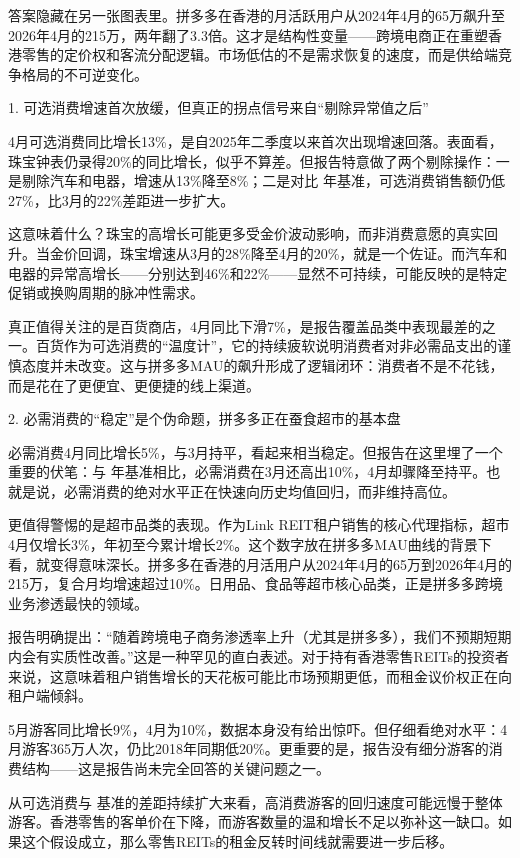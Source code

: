 \documentclass[11pt]{ctexart}
\begin{document}
答案隐藏在另一张图表里。拼多多在香港的月活跃用户从2024年4月的65万飙升至2026年4月的215万，两年翻了3.3倍。这才是结构性变量——跨境电商正在重塑香港零售的定价权和客流分配逻辑。市场低估的不是需求恢复的速度，而是供给端竞争格局的不可逆变化。

1. 可选消费增速首次放缓，但真正的拐点信号来自“剔除异常值之后”

4月可选消费同比增长13\%，是自2025年二季度以来首次出现增速回落。表面看，珠宝钟表仍录得20\%的同比增长，似乎不算差。但报告特意做了两个剔除操作：一是剔除汽车和电器，增速从13\%降至8\%；二是对比 年基准，可选消费销售额仍低27\%，比3月的22\%差距进一步扩大。

这意味着什么？珠宝的高增长可能更多受金价波动影响，而非消费意愿的真实回升。当金价回调，珠宝增速从3月的28\%降至4月的20\%，就是一个佐证。而汽车和电器的异常高增长——分别达到46\%和22\%——显然不可持续，可能反映的是特定促销或换购周期的脉冲性需求。

真正值得关注的是百货商店，4月同比下滑7\%，是报告覆盖品类中表现最差的之一。百货作为可选消费的“温度计”，它的持续疲软说明消费者对非必需品支出的谨慎态度并未改变。这与拼多多MAU的飙升形成了逻辑闭环：消费者不是不花钱，而是花在了更便宜、更便捷的线上渠道。

2. 必需消费的“稳定”是个伪命题，拼多多正在蚕食超市的基本盘

必需消费4月同比增长5\%，与3月持平，看起来相当稳定。但报告在这里埋了一个重要的伏笔：与 年基准相比，必需消费在3月还高出10\%，4月却骤降至持平。也就是说，必需消费的绝对水平正在快速向历史均值回归，而非维持高位。

更值得警惕的是超市品类的表现。作为Link REIT租户销售的核心代理指标，超市4月仅增长3\%，年初至今累计增长2\%。这个数字放在拼多多MAU曲线的背景下看，就变得意味深长。拼多多在香港的月活用户从2024年4月的65万到2026年4月的215万，复合月均增速超过10\%。日用品、食品等超市核心品类，正是拼多多跨境业务渗透最快的领域。

报告明确提出：“随着跨境电子商务渗透率上升（尤其是拼多多），我们不预期短期内会有实质性改善。”这是一种罕见的直白表述。对于持有香港零售REITs的投资者来说，这意味着租户销售增长的天花板可能比市场预期更低，而租金议价权正在向租户端倾斜。

5月游客同比增长9\%，4月为10\%，数据本身没有给出惊吓。但仔细看绝对水平：4月游客365万人次，仍比2018年同期低20\%。更重要的是，报告没有细分游客的消费结构——这是报告尚未完全回答的关键问题之一。

从可选消费与 基准的差距持续扩大来看，高消费游客的回归速度可能远慢于整体游客。香港零售的客单价在下降，而游客数量的温和增长不足以弥补这一缺口。如果这个假设成立，那么零售REITs的租金反转时间线就需要进一步后移。
\end{document}

